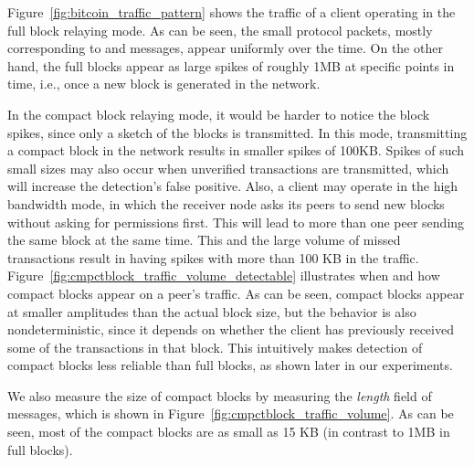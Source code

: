 Figure~\ref{fig:bitcoin_traffic_pattern} shows the traffic of a \bc client operating in the full block relaying mode.
As can be seen, the small protocol packets, mostly corresponding to  and  messages, appear 
uniformly over the time. 
On the other hand, the \bc full blocks appear as large spikes of roughly 1MB at specific points in time, i.e., once a new block is generated in the network. 

In the compact block relaying mode, it would be harder to notice the block spikes, 
since only a sketch of the blocks is transmitted. In this mode, transmitting a compact block in the network results in smaller spikes of 100KB. Spikes of such small sizes may also occur when unverified transactions are transmitted, which will increase the detection's false positive. Also, a \bc client may operate in the high bandwidth mode, in which the receiver node  asks its peers to send new blocks without asking for permissions first. This will lead to more than one peer sending the same block at the same time. This and the large volume of missed transactions result in having spikes with more than 100 KB in the traffic. 
Figure~\ref{fig:cmpctblock_traffic_volume_detectable} illustrates  when and how
compact blocks appear on a peer's traffic. As can be seen, compact blocks appear at
smaller amplitudes than the actual block size, but the behavior is also nondeterministic,
since it depends on whether the client has previously received some of the transactions
in that block. This intuitively makes detection of compact blocks less reliable than full blocks, as shown later in our experiments. 

We also measure the size of compact blocks by measuring the 
\textit{length} field of  messages, which is shown in Figure~\ref{fig:cmpctblock_traffic_volume}. 
As can be seen, most of the compact blocks are as small as 15 KB (in contrast to 1MB in full blocks). 

